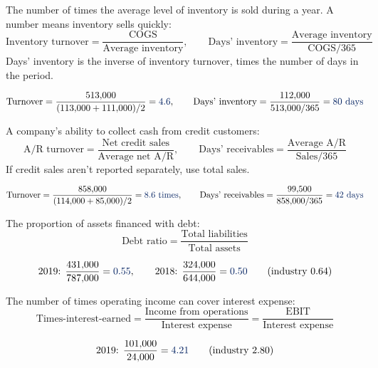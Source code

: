 \begin{definition}
    The number of times the average level of inventory is sold during a
    year. A  number means inventory sells quickly:
    \[\boxed{\text{Inventory turnover} = \frac{\text{COGS}}{\text{Average inventory}}, \qquad \text{Days' inventory} = \frac{\text{Average inventory}}{\text{COGS}/365}}\]
    Days' inventory is the inverse of inventory turnover, times the number
    of days in the period.
\end{definition}
\[\text{Turnover} = \frac{513{,}000}{(113{,}000 + 111{,}000)/2} = \db{4.6}, \qquad \text{Days' inventory} = \frac{112{,}000}{513{,}000/365} = \db{80 \text{ days}}\]

\begin{definition}
    A company's ability to collect cash from credit customers:
    \[\boxed{\text{A/R turnover} = \frac{\text{Net credit sales}}{\text{Average net A/R}}, \qquad \text{Days' receivables} = \frac{\text{Average A/R}}{\text{Sales}/365}}\]
    If credit sales aren't reported separately, use total sales.
\end{definition}
\[\text{Turnover} = \frac{858{,}000}{(114{,}000 + 85{,}000)/2} = \db{8.6 \text{ times}}, \qquad \text{Days' receivables} = \frac{99{,}500}{858{,}000/365} = \db{42 \text{ days}}\]

\begin{definition}
    The proportion of assets financed with debt:
    \[\boxed{\text{Debt ratio} = \frac{\text{Total liabilities}}{\text{Total assets}}}\]
\end{definition}
\[\text{2019: } \frac{431{,}000}{787{,}000} = \db{0.55}, \qquad \text{2018: } \frac{324{,}000}{644{,}000} = \db{0.50} \qquad (\text{industry } 0.64)\]

\begin{definition}
    The number of times operating income can cover interest expense:
    \[\boxed{\text{Times-interest-earned} = \frac{\text{Income from operations}}{\text{Interest expense}} = \frac{\text{EBIT}}{\text{Interest expense}}}\]
\end{definition}
\[\text{2019: } \frac{101{,}000}{24{,}000} = \db{4.21} \qquad (\text{industry } 2.80)\]

